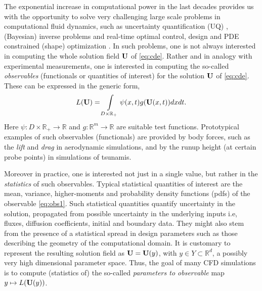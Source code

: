 \documentclass[a4paper]{article}
\numberwithin{equation}{section}
\numberwithin{equation}{section}
\theoremstyle{definition}
\theoremstyle{myremarkstyle}
\newcommand{\R}{\mathbb{R}}
\newcommand{\U}{{\bf U}}		%
\begin{document}
The exponential increase in computational power in the last decades provides us with the opportunity to solve very challenging large scale problems in computational fluid dynamics, such as uncertainty quantification (UQ)  \cite{UQbook,UQhb}, (Bayesian) inverse problems \cite{STU1}  and real-time optimal control, design and PDE constrained (shape) optimization \cite{OC,OC1}. In such problems, one is not always interested in computing the whole solution field $\U$ of \eqref{eq:cde}. Rather and in analogy with experimental measurements, one is interested in computing the so-called \emph{observables} (functionals or quantities of interest) for the solution $\U$ of \eqref{eq:cde}. These can be expressed in the generic form,
\begin{equation}
\label{eq:obs1}
L(\U) = \int\limits_{D \times \R_+} \psi(x,t) g(\U(x,t)) dx dt.
\end{equation}
Here $\psi:D \times \R_+ \rightarrow \R$ and $g:\R^m \rightarrow \R$ are suitable test functions. Prototypical examples of such observables (functionals) are provided by body forces, such as the \emph{lift} and \emph{drag} in aerodynamic simulations, and by the runup height (at certain probe points) in simulations of tsunamis.

Moreover in practice, one is interested not just in a single value, but rather in the \emph{statistics} of such observables. Typical statistical quantities of interest are the mean, variance, higher-moments and probability density functions (pdfs) of the observable \eqref{eq:obs1}. Such statistical quantities quantify uncertainty in the solution, propagated from possible uncertainty in the underlying inputs i.e, fluxes, diffusion coefficients, initial and boundary data. They might also stem from the presence of a statistical spread in design parameters such as those describing the geometry of the computational domain. It is customary to represent the resulting solution field as $\U = \U(y)$, with $y \in Y \subset \R^{d}$, a possibly very high dimensional parameter space. Thus, the goal of many CFD simulations is to compute (statistics of) the so-called \emph{parameters to observable} map $y \mapsto L(\U(y))$. 
\end{document}
